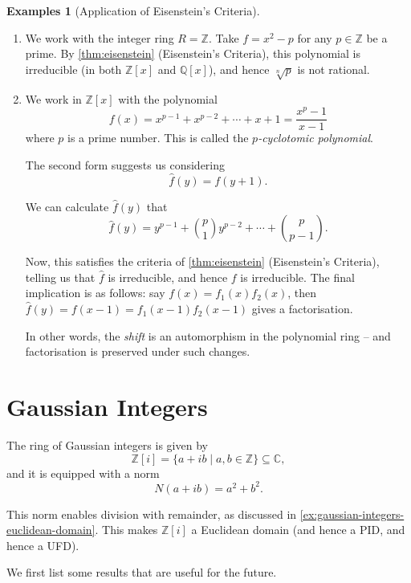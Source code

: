 \documentclass{article}
\theoremstyle{definition}
\newtheorem{examples}[theorem]{Examples}
\theoremstyle{remark}
\newcommand{\pqty}[1]{\left(#1\right)}
\newcommand{\bqty}[1]{\left[#1\right]}
\newcommand{\set}[2]{\{#1\mid #2\}}
\newcommand{\subring}{\subseteq}
\newcommand{\ZZ}{\mathbb{Z}}
\newcommand{\QQ}{\mathbb{Q}}
\newcommand{\CC}{\mathbb{C}}
\begin{document}
\begin{examples}[Application of Eisenstein's Criteria]
    \label{ex:application-of-eisenstein}%
    \begin{enumerate}
        \item We work with the integer ring \(R = \ZZ\). Take \(f = x^2 - p\) for any \(p \in \ZZ\) be a prime. By \autoref{thm:eisenstein} (Eisenstein's Criteria), this polynomial is irreducible (in both \(\ZZ\bqty{x}\) and \(\QQ\bqty{x}\)), and hence \(\sqrt[n]{p}\) is not rational.
        \item We work in \(\ZZ\bqty{x}\) with the polynomial
        \[
            f\pqty{x} = x^{p - 1} + x^{p - 2} + \cdots + x + 1 = \frac{x^p - 1}{x - 1}
        \]
        where \(p\) is a prime number. This is called the \emph{\(p\)-cyclotomic polynomial}.

        The second form suggests us considering
        \[
            \hat{f} \pqty{y} = f\pqty{y + 1}.
        \]

        We can calculate \(\hat{f} \pqty{y}\) that
        \[
            \hat{f} \pqty{y} = y^{p - 1} + \binom{p}{1} y^{p - 2} + \cdots + \binom{p}{p - 1}.
        \]

        Now, this satisfies the criteria of \autoref{thm:eisenstein} (Eisenstein's Criteria), telling us that \(\hat{f}\) is irreducible, and hence \(f\) is irreducible. The final implication is as follows: say \(f\pqty{x} = f_1\pqty{x} f_2\pqty{x}\), then \(\hat{f} \pqty{y} = f\pqty{x - 1} = f_1\pqty{x - 1} f_2\pqty{x - 1}\) gives a factorisation.

        In other words, the \emph{shift} is an automorphism in the polynomial ring -- and factorisation is preserved under such changes.
    \end{enumerate}
\end{examples}

\section{Gaussian Integers}

The ring of Gaussian integers is given by
\[
    \ZZ\bqty{i} = \set{a + ib}{a, b \in \ZZ} \subring \CC,
\]
and it is equipped with a norm
\[
    N\pqty{a + ib} = a^2 + b^2.
\]

This norm enables division with remainder, as discussed in \autoref{ex:gaussian-integers-euclidean-domain}. This makes \(\ZZ\bqty{i}\) a Euclidean domain (and hence a PID, and hence a UFD).

We first list some results that are useful for the future.
\end{document}
